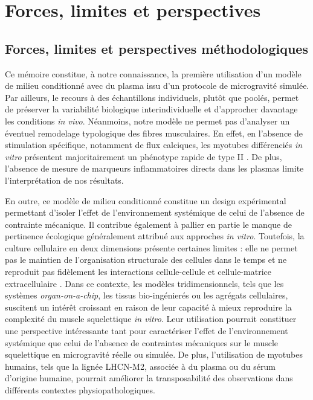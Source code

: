 \documentclass[11pt]{report}
\begin{document}
\section{Forces, limites et perspectives}

\subsection{Forces, limites et perspectives méthodologiques}

Ce mémoire constitue, à notre connaissance, la première utilisation d'un modèle de milieu conditionné avec du plasma issu d'un protocole de microgravité simulée. Par ailleurs, le recours à des échantillons individuels, plutôt que poolés, permet de préserver la variabilité biologique interindividuelle et d'approcher davantage les conditions \textit{in vivo}. Néanmoins, notre modèle ne permet pas d'analyser un éventuel remodelage typologique des fibres musculaires. En effet, en l'absence de stimulation spécifique, notamment de flux calciques, les myotubes différenciés \textit{in vitro} présentent majoritairement un phénotype rapide de type II \parencite{Lu2023Sep}. De plus, l'absence de mesure de marqueurs inflammatoires directs dans les plasmas limite l'interprétation de nos résultats.

En outre, ce modèle de milieu conditionné constitue un design expérimental permettant d'isoler l'effet de l'environnement systémique de celui de l'absence de contrainte mécanique. Il contribue également à pallier en partie le manque de pertinence écologique généralement attribué aux approches \textit{in vitro}. Toutefois, la culture cellulaire en deux dimensions présente certaines limites : elle ne permet pas le maintien de l'organisation structurale des cellules dans le temps et ne reproduit pas fidèlement les interactions cellule-cellule et cellule-matrice extracellulaire \parencite{Perez-Diaz2025Jun}. Dans ce contexte, les modèles tridimensionnels, tels que les systèmes \textit{organ-on-a-chip}, les tissus bio-ingénierés ou les agrégats cellulaires, suscitent un intérêt croissant en raison de leur capacité à mieux reproduire la complexité du muscle squelettique \textit{in vitro}. Leur utilisation pourrait constituer une perspective intéressante tant pour caractériser l'effet de l'environnement systémique que celui de l'absence de contraintes mécaniques sur le muscle squelettique en microgravité réelle ou simulée. De plus, l'utilisation de myotubes humains, tels que la lignée LHCN-M2, associée à du plasma ou du sérum d'origine humaine, pourrait améliorer la transposabilité des observations dans différents contextes physiopathologiques.
\end{document}
